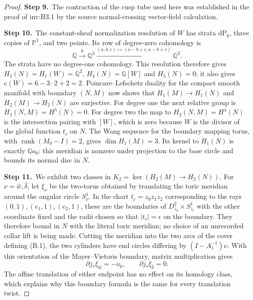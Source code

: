 \documentclass[11pt,a4paper]{article}
\theoremstyle{plain}
\theoremstyle{definition}
\DeclareMathOperator{\rank}{rank}
\begin{document}
\begin{proof}
\par\smallskip\noindent\textbf{Step 9.}\ The contraction of the cusp tube used here was established in the proof of inv:B3.1 by the source normal-crossing vector-field calculation.

\par\smallskip\noindent\textbf{Step 10.}\ The constant-sheaf normalization resolution of $W$ has strata
$\mathrm{dP}_6$, three copies of $\mathbb P^1$, and two points.
Its row of degree-zero cohomology is
\[
 \mathbb Q\xrightarrow{0}\mathbb Q^3
 \xrightarrow{(a,b,c)\mapsto(a-b+c,a-b+c)}\mathbb Q^2.
\]
The strata have no degree-one cohomology. This resolution therefore
gives $H_1(N)=H_1(W)=\mathbb Q^2$, $H_4(N)=\mathbb Q[W]$ and $H_5(N)=0$;
it also gives $e(W)=6-3\cdot2+2=2$.
Poincare--Lefschetz duality for the compact smooth manifold with
boundary $(N,M)$ now shows that $H_1(M)\to H_1(N)$ and
$H_2(M)\to H_2(N)$ are surjective. For degree one the next
relative group is $H_1(N,M)=H^5(N)=0$.
For degree two the map to $H_2(N,M)=H^4(N)$ is the intersection
pairing with $[W]$, which is zero because $W$ is the divisor of
the global function $t_c$ on $N$. The Wang sequence for the
boundary mapping torus, with $\rank(M_0-I)=2$, gives
$\dim H_1(M)=3$. Its kernel to $H_1(N)$ is exactly
$\mathbb Q a_0$: this meridian is nonzero under projection to the base
circle and bounds its normal disc in $N$.

\par\smallskip\noindent\textbf{Step 11.}\ We exhibit two classes in
$K_2=\ker(H_2(M)\to H_2(N))$.
For $\nu=\hat w,\hat\delta$, let $\xi_\nu$ be the two-torus
obtained by translating the toric meridian around the angular
circle $S^1_\nu$. In the chart $t_c=z_0z_1z_2$ corresponding to
the rays $(0,1),(e_1,1),(e_2,1)$, these are the boundaries of
$D^2_{z_0}\times S^1_{z_i}$ with the other coordinate fixed
and the radii chosen so that $|t_c|=\epsilon$ on the boundary.
They therefore bound in $N$ with the literal toric meridian;
no choice of an unrecorded collar lift is being made.
Cutting the meridian into the two arcs of the cover defining
(B.1), the two cylinders have end circles differing by
$(I-A_1^{-1})\nu$. With this orientation of the Mayer--Vietoris
boundary, matrix multiplication gives
\[
 \partial j_*\xi_{\hat w}=-\nu_0,\qquad
 \partial j_*\xi_{\hat\delta}=0.                       \tag{B.3}
\]
The affine translation of either endpoint has no effect on its
homology class, which explains why this boundary formula is the
same for every translation twist.


\end{proof}
\end{document}
